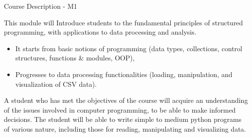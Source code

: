 \documentclass{beamer}%
\begin{document}


\begin{frame}{Course Description - M1}
\begin{block}{This module will }
Introduce students to the fundamental principles of structured programming, with applications to data processing and analysis. 
\begin{itemize}
	\item It starts from basic notions of programming (data types, collections, control structures, functions \& modules, OOP),
	\item Progresses to data processing functionalities (loading, manipulation, and visualization of CSV data).
\end{itemize}
\end{block}

\pause

\begin{block}{A student who has met the objectives of the course will}
 acquire an understanding of the issues involved in computer programming, to be able to make informed decisions. The student will be able to write simple to medium python programs of various nature, including those for reading, manipulating and visualizing data. %
\end{block}
\end{frame}
\end{document}
